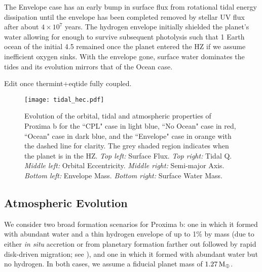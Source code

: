 \documentclass[preprint,12pt]{aastex}
\newcommand{\xxx}[1]{{\color{red} #1}} %
\def\mearth{{\rm\,M_\oplus}}
\begin{document}
The Envelope case has an early bump in surface flux from rotational
tidal energy dissipation until the envelope has been completed removed
by stellar UV flux after about $4 \times 10^7$ years.  The hydrogen
envelope initially shielded the planet's water allowing for enough to
survive subsequent photolysis such that 1 Earth ocean of the initial
4.5 remained once the planet entered the HZ if we assume inefficient oxygen sinks.  With the envelope gone,
surface water dominates the tides and its evolution mirrors that of
the Ocean case.

\xxx{Edit once thermint+eqtide fully coupled.}

\begin{figure} 
\centering
\texttt{[image: tidal\_hec.pdf]}
\caption{Evolution of the orbital, tidal and atmospheric properties of
  Proxima b for the ``CPL" case in light blue, ``No Ocean" case in
  red, ``Ocean" case in dark blue, and the ``Envelope" case in orange
  with the dashed line for clarity.  The grey shaded region indicates
  when the planet is in the HZ. {\it Top left:} Surface Flux. {\it Top
    right:} Tidal Q. {\it Middle left:} Orbital Eccentricity. {\it
    Middle right:} Semi-major Axis. {\it Bottom left:} Envelope
  Mass. {\it Bottom right:} Surface Water Mass.}
\label{fig:tidal_hec}
\end{figure}


\subsection{Atmospheric Evolution}
\label{sec:results:atmesc}

We consider two broad formation scenarios for Proxima b: one in which
it formed with abundant water and a thin hydrogen envelope of up to
1\% by mass (due to either \emph{in situ} accretion or from planetary
formation farther out followed by rapid disk-driven migration; see
\cite{Luger15}), and one in which it formed with abundant water but no
hydrogen. In both cases, we assume a fiducial planet mass of $1.27
\mearth$.
\end{document}
